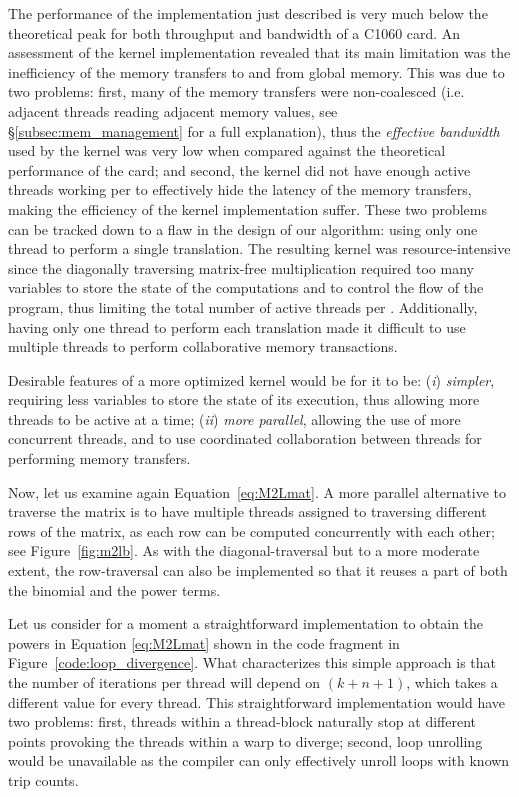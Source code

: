 The performance of the implementation just described is very much below the theoretical peak for both throughput and bandwidth of a C1060 {\tesla} card. An assessment of the {\cuda} kernel implementation revealed that its main limitation was the inefficiency of the memory transfers to and from global memory. This was due to two problems: first, many of the memory transfers were non-coalesced (i.e. adjacent threads reading adjacent memory values, see \S\ref{subsec:mem_management} for a full explanation), thus the \emph{effective bandwidth} used by the kernel was very low when compared against the theoretical performance of the card; and second, the kernel did not have enough active threads working per {\sm} to effectively hide the latency of the memory transfers, making the efficiency of the kernel implementation suffer. These two problems can be tracked down to a flaw in the design of our algorithm: using only one {\cuda} thread to perform a single translation.
The resulting kernel was resource-intensive since the diagonally traversing matrix-free multiplication required too many variables to store the state of the computations and to control the flow of the program, thus limiting the total number of active threads per {\sm}.
Additionally, having only one thread to perform each translation made it difficult to use multiple threads to perform collaborative memory transactions. 

Desirable features of a more optimized kernel would be for it to be: (\emph{i}) \emph{simpler}, requiring less variables to store the state of its execution, thus allowing more threads to be active at a time; (\emph{ii}) \emph{more parallel}, allowing the use of more concurrent threads, and to use coordinated collaboration between threads for performing memory transfers. 

Now, let us examine again Equation~\eqref{eq:M2Lmat}. A more parallel alternative to traverse the matrix is to have multiple {\cuda} threads assigned to traversing different rows of the matrix, as each row can be computed concurrently with each other; see Figure~\ref{fig:m2lb}.
As with the diagonal-traversal but to a more moderate extent, the row-traversal can also be implemented so that it reuses a part of both the binomial and the power terms.

Let us consider for a moment a straightforward implementation to obtain the powers in Equation \eqref{eq:M2Lmat} shown in the code fragment in Figure~\ref{code:loop_divergence}. What characterizes this simple approach is that the number of iterations per thread will depend on $(k+n+1)$, which takes a different value for every thread. This straightforward implementation would have two problems: first, threads within a thread-block naturally stop at different points provoking the threads within a warp to diverge; second, loop unrolling would be unavailable as the compiler can only effectively unroll loops with known trip counts.

